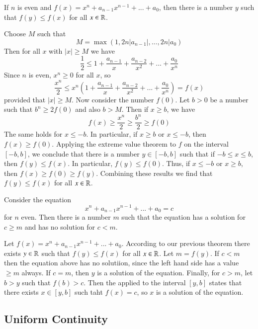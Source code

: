 \documentclass[12pt]{report}
\begin{document}
\begin{thm}{}{}
    If $n$ is even and $f(x) = x^n+a_{n-1}x^{n-1} + ... + a_0$, then there is a number $y$ such that $f(y) \leq f(x)$ for all $x \in \mathbb R$.
\end{thm}
\begin{proof*}{}{}
    Choose $M$ such that $$M = \max(1,2n|a_{n-1}|,...,2n|a_0)$$
    Then for all $x$ with $|x| \geq M$ we have $$\frac{1}{2} \leq 1 + \frac{a_{n-1}}{x} + \frac{a_{n-2}}{x^2} + ... + \frac{a_0}{x^n}$$
    Since $n$ is even, $x^n \geq 0$ for all $x$, so $$\frac{x^n}{2} \leq x^n\left(1 + \frac{a_{n-1}}{x} + \frac{a_{n-2}}{x^2} + ... + \frac{a_0}{x^n}\right) = f(x)$$
    provided that $|x| \geq M$. Now consider the number $f(0)$. Let $b > 0$ be a number such that $b^n \geq 2f(0)$ and also $b > M$. Then if $x \geq b$, we have $$f(x) \geq \frac{x^n}{2} \geq \frac{b^n}{2} \geq f(0)$$
    The same holds for $x \leq -b$. In particular, if $x \geq b$ or $x \leq -b$, then $f(x) \geq f(0)$. Applying the extreme value theorem to $f$ on the interval $[-b,b]$, we conclude that there is a number $y \in [-b,b]$ such that if $-b \leq x \leq b$, then $f(y) \leq f(x)$. In particular, $f(y) \leq f(0)$. Thus, if $x \leq -b$ or $x \geq b$, then $f(x) \geq f(0) \geq f(y)$. Combining these results we find that $f(y) \leq f(x)$ for all $x \in \mathbb R$.
\end{proof*}


\begin{cor}{}{}
    Consider the equation \begin{equation}
        x^n +a_{n-1}x^{n-1} + ... + a_0 = c
    \end{equation}
    for $n$ even. Then there is a number $m$ such that the equation has a solution for $c \geq m$ and has no solution for $c < m$.
\end{cor}
\begin{proof*}{}{}
    Let $f(x) = x^n + a_{n-1}x^{n-1} + ...+ a_0$. According to our previous theorem there exists $y \in \mathbb R$ such that $f(y) \leq f(x)$ for all $x \in \mathbb R$. Let $m = f(y)$. If $c < m$ then the equation above has no solutiion, since the left hand side has a value $\geq m$ always. If $c = m$, then $y$ is a solution of the equation. Finally, for $c > m$, let $b > y$ such that $f(b) > c$. Then the  applied to the interval $[y,b]$ states that there exists $x \in [y,b]$ such taht $f(x) = c$, so $x$ is a solution of the equation.
\end{proof*}


\subsection{Uniform Continuity}
\end{document}
